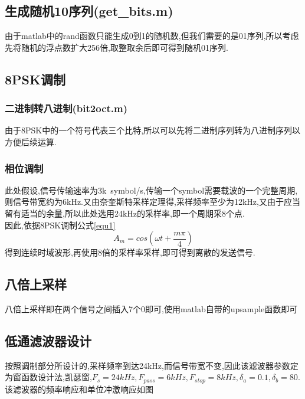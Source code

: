 \documentclass[UTF8]{article}
\begin{document}
\begin{CJK}{UTF8}{gkai}
\subsection{生成随机10序列(get\_bits.m)}
由于matlab中的rand函数只能生成0到1的随机数,但我们需要的是01序列,所以考虑先将随机的浮点数扩大256倍,取整取余后即可得到随机01序列.
\subsection{8PSK调制}
\subsubsection{二进制转八进制(bit2oct.m)}
由于8PSK中的一个符号代表三个比特,所以可以先将二进制序列转为八进制序列以方便后续运算.
\subsubsection{相位调制}
此处假设,信号传输速率为3k\ symbol/s,传输一个symbol需要载波的一个完整周期,则信号带宽约为6kHz.又由奈奎斯特采样定理得,采样频率至少为12kHz,又由于应当留有适当的余量,所以此处选用24kHz的采样率,即一个周期采8个点.\\
因此,依据8PSK调制公式\ref{equ1}$$\label{equ1}A_m=cos(\omega t+\frac{m\pi}{4})$$得到连续时域波形,再使用8倍的采样率采样,即可得到离散的发送信号.
\subsection{八倍上采样}
八倍上采样即在两个信号之间插入7个0即可,使用matlab自带的upsample函数即可
\subsection{低通滤波器设计}
按照调制部分所设计的,采样频率到达24kHz,而信号带宽不变,因此该滤波器参数定为窗函数设计法,凯瑟窗,$F_{s}=24kHz,F_{pass}=6kHz,F_{stop}=8kHz,\delta_a=0.1,\delta_b=80$.
该滤波器的频率响应和单位冲激响应如图
\begin{figure}[H]
  \centering
\end{figure}

\end{CJK}
\end{document}
